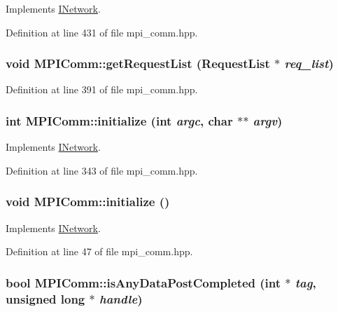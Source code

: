 Implements \hyperlink{class_i_network_a062d228ccf152a98c8255bda414d956d}{INetwork}.

Definition at line 431 of file mpi\_\-comm.hpp.\hypertarget{class_m_p_i_comm_a56487e629b2877138f00cb01dfcfee08}{
\subsubsection[{getRequestList}]{\setlength{\rightskip}{0pt plus 5cm}void MPIComm::getRequestList ({\bf RequestList} $\ast$ {\em req\_\-list})}}
\label{class_m_p_i_comm_a56487e629b2877138f00cb01dfcfee08}


Definition at line 391 of file mpi\_\-comm.hpp.\hypertarget{class_m_p_i_comm_afd22e4e486b60da08f0b783c18ca0e2b}{
\subsubsection[{initialize}]{\setlength{\rightskip}{0pt plus 5cm}int MPIComm::initialize (int {\em argc}, \/  char $\ast$$\ast$ {\em argv})}}
\label{class_m_p_i_comm_afd22e4e486b60da08f0b783c18ca0e2b}


Implements \hyperlink{class_i_network_a5c706262a4275f321687a189686a2b81}{INetwork}.

Definition at line 343 of file mpi\_\-comm.hpp.\hypertarget{class_m_p_i_comm_aa21508c017028ad002b01cdecc10a247}{
\subsubsection[{initialize}]{\setlength{\rightskip}{0pt plus 5cm}void MPIComm::initialize ()}}
\label{class_m_p_i_comm_aa21508c017028ad002b01cdecc10a247}


Implements \hyperlink{class_i_network_a6a9104cce9246feb6b8fc08b15e7c171}{INetwork}.

Definition at line 47 of file mpi\_\-comm.hpp.\hypertarget{class_m_p_i_comm_ace0d0f43b30dcb479d387c7d39735cd9}{
\subsubsection[{isAnyDataPostCompleted}]{\setlength{\rightskip}{0pt plus 5cm}bool MPIComm::isAnyDataPostCompleted (int $\ast$ {\em tag}, \/  unsigned long $\ast$ {\em handle})}}
\label{class_m_p_i_comm_ace0d0f43b30dcb479d387c7d39735cd9}


